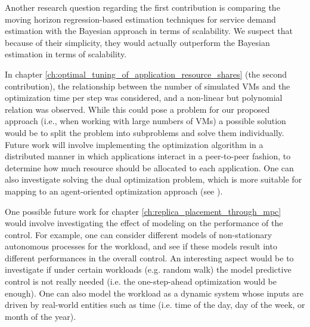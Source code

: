  Another research question regarding the first contribution is comparing the moving horizon regression-based estimation techniques for service demand estimation with the Bayesian approach in terms of scalability. We suspect that because of their simplicity, they would actually outperform the Bayesian estimation in terms of scalability.
 
In chapter \ref{ch:optimal_tuning_of_application_resource_shares} (the second contribution), the relationship between the number of simulated VMs and the optimization time per step was considered, and a non-linear but polynomial relation was observed. While this could pose a problem for our proposed approach (i.e., when working with large numbers of VMs) a possible solution would be to split the problem into subproblems and solve them individually. Future work will involve implementing the optimization algorithm in a distributed manner in which applications interact in a peer-to-peer fashion, to determine how much resource should be allocated to each application. One can also investigate solving the dual optimization problem, which is more suitable for mapping to an agent-oriented optimization approach (see \cite{huang_macroeconomics_2008,izakian_auction_2010}).  


One possible future work for chapter \ref{ch:replica_placement_through_mpc} would involve investigating the effect of modeling on the performance of the control. For example, one can consider different models of non-stationary autonomous processes for the workload, and see if these models result into different performances in the overall control. An interesting aspect would be to investigate if under certain workloads (e.g. random walk) the model predictive control is not really needed (i.e. the one-step-ahead optimization would be enough).  
One can also model the workload as a dynamic system whose inputs are driven by real-world entities such as time (i.e. time of the day, day of the week, or month of the year).   

